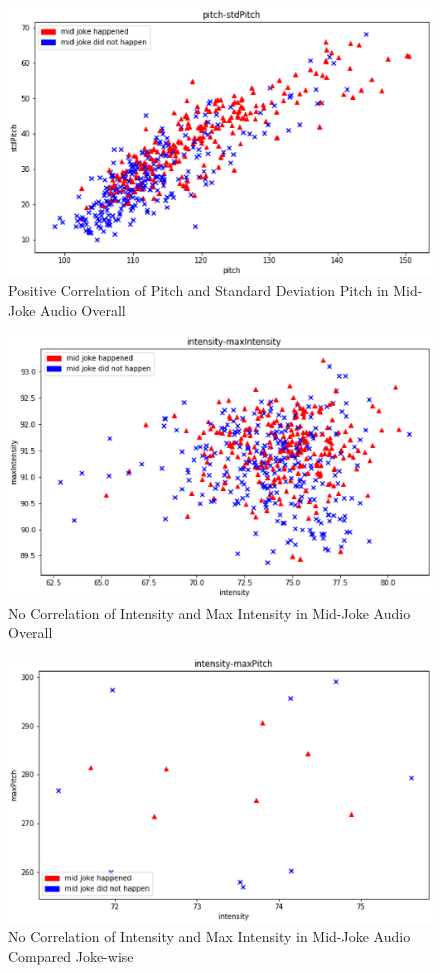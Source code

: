 \documentclass[onecolumn, draftclsnofoot,10pt, compsoc]{IEEEtran}
\begin{document}
\begin{figure}[!h]
\includegraphics{assets/fig18.eps}
\caption{Positive Correlation of Pitch and Standard Deviation Pitch in Mid-Joke Audio Overall}
\end{figure}

\begin{figure}[!h]
\includegraphics{assets/fig19.eps}
\caption{No Correlation of Intensity and Max Intensity in Mid-Joke Audio Overall}
\end{figure}

\begin{figure}[!h]
\includegraphics{assets/fig20.eps}
\caption{No Correlation of Intensity and Max Intensity in Mid-Joke Audio Compared Joke-wise}
\end{figure}
\end{document}
